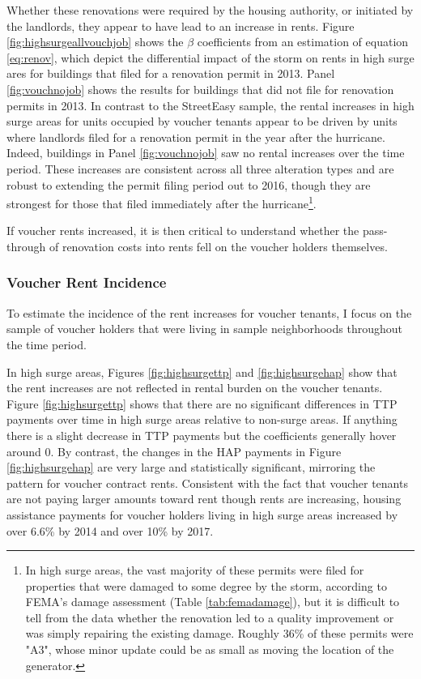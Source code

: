 \documentclass[12pt]{article}
\begin{document}
{{{{{Whether these renovations were required by the housing authority, or initiated by the landlords, they appear to have lead to an increase in rents. Figure \ref{fig:highsurgeallvouchjob} shows the $\beta$ coefficients from an estimation of equation \ref{eq:renov}, which depict the differential impact of the storm on rents in high surge ares for buildings that filed for a renovation permit in 2013.  Panel \ref{fig:vouchnojob} shows the results for buildings that did not file for renovation permits in 2013.  In contrast to the StreetEasy sample, the rental increases in high surge areas for units occupied by voucher tenants appear to be driven by units where landlords filed for a renovation permit in the year after the hurricane. Indeed, buildings in Panel \ref{fig:vouchnojob} saw no rental increases over the time period.  These increases are consistent across all three alteration types and are robust to extending the permit filing period out to 2016, though they are strongest for those that filed immediately after the hurricane\footnote {In high surge areas, the vast majority of these permits were filed for properties that were damaged to some degree by the storm, according to FEMA's damage assessment (Table \ref{tab:femadamage}), but it is difficult to tell from the data whether the renovation led to a quality improvement or was simply repairing the existing damage. Roughly 36\% of these permits were "A3", whose minor update could be as small as moving the location of the generator.}.

If voucher rents increased, it is then critical to understand whether the pass-through of renovation costs into rents fell on the voucher holders themselves.

\subsubsection{Voucher Rent Incidence}
To estimate the incidence of the rent increases for voucher tenants, I focus on the sample of voucher holders that were living in sample neighborhoods throughout the time period. 

In high surge areas, Figures \ref{fig:highsurgettp} and \ref{fig:highsurgehap} show that the rent increases are not reflected in rental burden on the voucher tenants.  Figure \ref{fig:highsurgettp} shows that there are no significant differences in TTP payments over time in high surge areas relative to non-surge areas.  If anything there is a slight decrease in TTP payments but the coefficients generally hover around 0.  By contrast, the changes in the HAP payments in Figure \ref{fig:highsurgehap} are very large and statistically significant, mirroring the pattern for voucher contract rents.  Consistent with the fact that voucher tenants are not paying larger amounts toward rent though rents are increasing, housing assistance payments for voucher holders living in high surge areas increased by over 6.6\% by 2014 and over 10\% by 2017. 
                                                                
}}}}}
\end{document}
